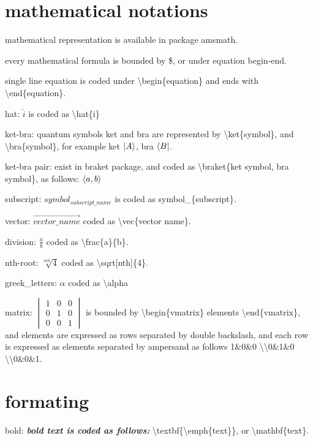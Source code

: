 \documentclass[a4paper,12pt]{book}
\begin{document}
\section{mathematical notations}

\begin{description}
\item mathematical representation is available in package amsmath.
\item every mathematical formula is bounded by \$, or under equation begin-end.
\item single line equation is coded under \textbackslash begin\{equation\} and ends with \textbackslash end\{equation\}.
\item hat: $\hat{i}$ is coded as \textbackslash hat\{i\}
\item ket-bra: quantum symbols ket and bra are represented by \textbackslash ket\{symbol\}, and \textbackslash bra\{symbol\}, for example ket $\ket{A}$, bra $\bra{B}$.
\item ket-bra pair: exist in braket package, and coded as \textbackslash braket\{ket symbol, bra symbol\}, as follows: $\braket{a,b}$
\item subscript: $symbol_{subscript\_name}$ is coded as symbol\_\{subscript\}.
\item vector: $\vec{vector\_name}$ coded as \textbackslash vec\{vector name\}.
\item division: $\frac{a}{b}$ coded as \textbackslash frac\{a\}\{b\}.
\item nth-root: $\sqrt[nth]{4}$ coded as \textbackslash sqrt[nth]\{4\}.
\item greek\_letters: $\alpha$ coded as \textbackslash alpha
\item matrix: $\begin{vmatrix}1&0&0\\0&1&0\\0&0&1\end{vmatrix}$ is bounded by \textbackslash begin\{vmatrix\} elements \textbackslash end\{vmatrix\}, and elements are expressed as rows separated by double backslash, and each row is expressed as elements separated by ampersand as follows  1\&0\&0 \textbackslash \textbackslash 0\&1\&0 \textbackslash \textbackslash 0\&0\&1.
\end{description}

\section{formating}

\begin{description}
\item bold: \textbf{\emph{bold text is coded as follows:}} \textbackslash textbf\{\textbackslash emph\{text\}\}, or \textbackslash mathbf\{text\}.
\end{description}
\end{document}
